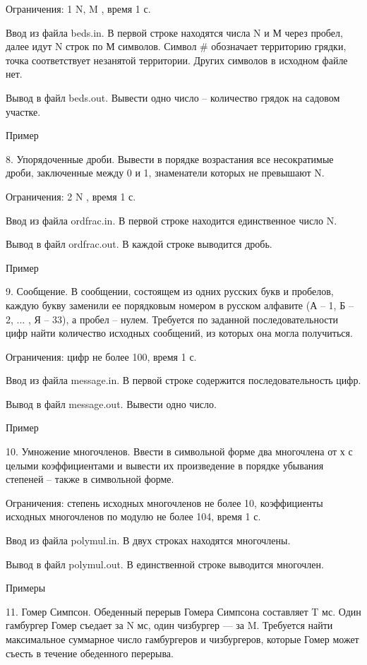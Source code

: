 \documentclass[]{article}
\begin{document}
Ограничения: 1 \leq N, M , время 1 с.

Ввод из файла beds.in. В первой строке находятся числа N и М через пробел, далее идут N строк по М символов. Символ # обозначает территорию грядки, точка соответствует незанятой территории. Других символов в исходном файле нет.

Вывод в файл beds.out. Вывести одно число – количество грядок на садовом участке.

Пример



8. Упорядоченные дроби. Вывести в порядке возрастания все несократимые дроби, заключенные между 0 и 1, знаменатели которых не превышают N.

Ограничения: 2 \leq N , время 1 с.

Ввод из файла ordfrac.in. В первой строке находится единственное число N.

Вывод в файл ordfrac.out. В каждой строке выводится дробь.

Пример



9. Сообщение. В сообщении, состоящем из одних русских букв и пробелов, каждую букву заменили ее порядковым номером в русском алфавите (А – 1, Б – 2, ... , Я – 33), а пробел – нулем. Требуется по заданной последовательности цифр найти количество исходных сообщений, из которых она могла получиться.

Ограничения: цифр не более 100, время 1 с.

Ввод из файла message.in. В первой строке содержится последовательность цифр.

Вывод в файл message.out. Вывести одно число.

Пример



10. Умножение многочленов. Ввести в символьной форме два многочлена от х с целыми коэффициентами и вывести их произведение в порядке убывания степеней – также в символьной форме.

Ограничения: степень исходных многочленов не более 10, коэффициенты исходных многочленов по модулю не более 104, время 1 с.

Ввод из файла polymul.in. В двух строках находятся многочлены.

Вывод в файл polymul.out. В единственной строке выводится многочлен.

Примеры



11. Гомер Симпсон. Обеденный перерыв Гомера Симпсона составляет T мс. Один гамбургер Гомер съедает за N мс, один чизбургер — за M. Требуется найти максимальное суммарное число гамбургеров и чизбургеров, которые Гомер может съесть в течение обеденного перерыва.
\end{document}
